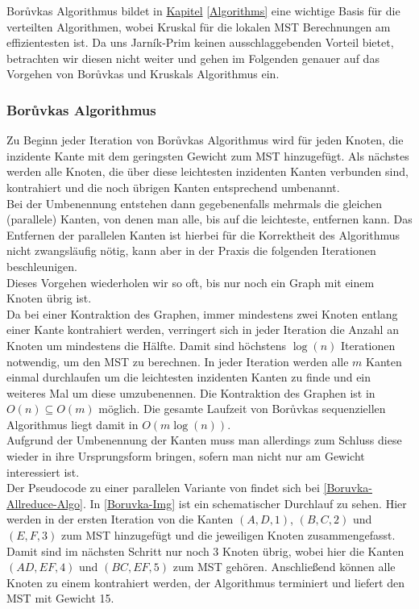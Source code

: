 Bor{\r u}vkas Algorithmus bildet in \hyperref[Algorithms]{Kapitel} \ref{Algorithms} eine wichtige Basis für die verteilten Algorithmen, wobei Kruskal für die lokalen MST Berechnungen am effizientesten ist. Da uns Jarník-Prim keinen ausschlaggebenden Vorteil bietet, betrachten wir diesen nicht weiter und gehen im Folgenden genauer auf das Vorgehen von Bor{\r u}vkas und Kruskals Algorithmus ein.

\subsubsection{Bor{\r u}vkas Algorithmus}
Zu Beginn jeder Iteration von Bor{\r u}vkas Algorithmus wird für jeden Knoten, die inzidente Kante mit dem geringsten Gewicht zum MST hinzugefügt.
Als nächstes werden alle Knoten, die über diese leichtesten inzidenten Kanten verbunden sind, kontrahiert und die noch übrigen Kanten entsprechend umbenannt. \\
Bei der Umbenennung entstehen dann gegebenenfalls mehrmals die gleichen (parallele) Kanten, von denen man alle, bis auf die leichteste, entfernen kann. Das Entfernen der parallelen Kanten ist hierbei für die Korrektheit des Algorithmus nicht zwangsläufig nötig, kann aber in der Praxis die folgenden Iterationen beschleunigen. \\
Dieses Vorgehen wiederholen wir so oft, bis nur noch ein Graph mit einem Knoten übrig ist. \\
Da bei einer Kontraktion des Graphen, immer mindestens zwei Knoten entlang einer Kante kontrahiert werden, verringert sich in jeder Iteration die Anzahl an Knoten um mindestens die Hälfte. Damit 
sind höchstens $\log(n)$ Iterationen notwendig, um den MST zu berechnen. In jeder Iteration werden alle $m$ Kanten einmal durchlaufen um die leichtesten inzidenten Kanten zu finde und ein weiteres Mal um diese umzubenennen. Die Kontraktion des Graphen ist in $O(n) \subseteq O(m)$ möglich. Die gesamte Laufzeit von Bor{\r u}vkas sequenziellen Algorithmus liegt damit in $O(m\log(n))$.\\
Aufgrund der Umbenennung der Kanten muss man allerdings zum Schluss diese wieder in ihre Ursprungsform bringen, sofern man nicht nur am Gewicht interessiert ist.\\

Der Pseudocode zu einer parallelen Variante von \boruvka findet sich bei \cref{Boruvka-Allreduce-Algo}. In \cref{Boruvka-Img} ist ein schematischer Durchlauf zu sehen. Hier werden in der ersten Iteration von \boruvka die Kanten $(A,D,1)$, $(B,C,2)$ und $(E,F,3)$ zum MST hinzugefügt und die jeweiligen Knoten zusammengefasst. Damit sind im nächsten Schritt nur noch 3 Knoten übrig, wobei hier die Kanten $(AD,EF,4)$ und $(BC,EF,5)$ zum MST gehören. Anschließend können alle Knoten zu einem kontrahiert werden, der Algorithmus terminiert und liefert den MST mit Gewicht 15.

